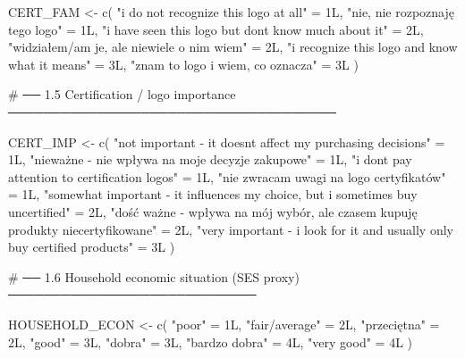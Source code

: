 \documentclass[
  letterpaper,
  DIV=11,
  numbers=noendperiod]{scrartcl}
\newenvironment{Shaded}{\begin{snugshade}}{\end{snugshade}}
\newcommand{\CommentTok}[1]{\textcolor[rgb]{0.37,0.37,0.37}{#1}}
\newcommand{\DecValTok}[1]{\textcolor[rgb]{0.68,0.00,0.00}{#1}}
\newcommand{\FunctionTok}[1]{\textcolor[rgb]{0.28,0.35,0.67}{#1}}
\newcommand{\NormalTok}[1]{\textcolor[rgb]{0.00,0.23,0.31}{#1}}
\newcommand{\OtherTok}[1]{\textcolor[rgb]{0.00,0.23,0.31}{#1}}
\newcommand{\StringTok}[1]{\textcolor[rgb]{0.13,0.47,0.30}{#1}}
\begin{document}
\begin{Shaded}
\begin{Highlighting}[]
\NormalTok{CERT\_FAM }\OtherTok{\textless{}{-}} \FunctionTok{c}\NormalTok{(}
  \StringTok{"i do not recognize this logo at all"}              \OtherTok{=} \DecValTok{1}\NormalTok{L,}
  \StringTok{"nie, nie rozpoznaję tego logo"}                    \OtherTok{=} \DecValTok{1}\NormalTok{L,}
  \StringTok{"i have seen this logo but don\textquotesingle{}t know much about it"} \OtherTok{=} \DecValTok{2}\NormalTok{L,}
  \StringTok{"widziałem/am je, ale niewiele o nim wiem"}         \OtherTok{=} \DecValTok{2}\NormalTok{L,}
  \StringTok{"i recognize this logo and know what it means"}     \OtherTok{=} \DecValTok{3}\NormalTok{L,}
  \StringTok{"znam to logo i wiem, co oznacza"}                  \OtherTok{=} \DecValTok{3}\NormalTok{L}
\NormalTok{)}




\CommentTok{\# ── 1.5  Certification / logo importance ─────────────────────────────────────}

\NormalTok{CERT\_IMP }\OtherTok{\textless{}{-}} \FunctionTok{c}\NormalTok{(}
  \StringTok{"not important {-} it doesn\textquotesingle{}t affect my purchasing decisions"} \OtherTok{=} \DecValTok{1}\NormalTok{L,}
  \StringTok{"nieważne {-} nie wpływa na moje decyzje zakupowe"}           \OtherTok{=} \DecValTok{1}\NormalTok{L,}
  \StringTok{"i don\textquotesingle{}t pay attention to certification logos"}             \OtherTok{=} \DecValTok{1}\NormalTok{L,}
  \StringTok{"nie zwracam uwagi na logo certyfikatów"}                   \OtherTok{=} \DecValTok{1}\NormalTok{L,}
  \StringTok{"somewhat important {-} it influences my choice, but i sometimes buy uncertified"} \OtherTok{=} \DecValTok{2}\NormalTok{L,}
  \StringTok{"dość ważne {-} wpływa na mój wybór, ale czasem kupuję produkty niecertyfikowane"} \OtherTok{=} \DecValTok{2}\NormalTok{L,}
  \StringTok{"very important {-} i look for it and usually only buy certified products"}         \OtherTok{=} \DecValTok{3}\NormalTok{L}
\NormalTok{)}



\CommentTok{\# ── 1.6  Household economic situation (SES proxy) ────────────────────────────}

\NormalTok{HOUSEHOLD\_ECON }\OtherTok{\textless{}{-}} \FunctionTok{c}\NormalTok{(}
  \StringTok{"poor"}         \OtherTok{=} \DecValTok{1}\NormalTok{L,}
  \StringTok{"fair/average"} \OtherTok{=} \DecValTok{2}\NormalTok{L,}
  \StringTok{"przeciętna"}   \OtherTok{=} \DecValTok{2}\NormalTok{L,}
  \StringTok{"good"}         \OtherTok{=} \DecValTok{3}\NormalTok{L,}
  \StringTok{"dobra"}        \OtherTok{=} \DecValTok{3}\NormalTok{L,}
  \StringTok{"bardzo dobra"} \OtherTok{=} \DecValTok{4}\NormalTok{L,}
  \StringTok{"very good"}    \OtherTok{=} \DecValTok{4}\NormalTok{L}
\NormalTok{)}



\end{Highlighting}
\end{Shaded}
\end{document}
